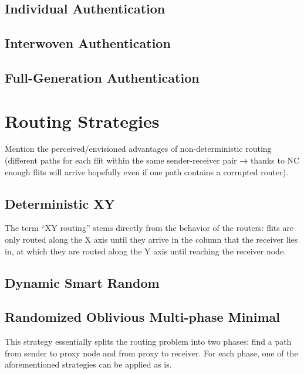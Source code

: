 \subsection{Individual Authentication}
\subsection{Interwoven Authentication}
\subsection{Full-Generation Authentication}

\section{Routing Strategies}
Mention the perceived/envisioned advantages of non-deterministic routing (different paths for each flit within the same sender-receiver pair → thanks
to NC enough flits will arrive hopefully even if one path contains a corrupted router).

\subsection{Deterministic XY}
The term \enquote{XY routing} stems directly from the behavior of the routers: flits are only routed along the X axis until they arrive in the column
that the receiver lies in, at which they are routed along the Y axis until reaching the receiver node.
\subsection{Dynamic Smart Random}
\subsection{Randomized Oblivious Multi-phase Minimal}
This strategy essentially splits the routing problem into two phases: find a path from sender to proxy node and from proxy to receiver. For each
phase, one of the aforementioned strategies can be applied as is.

